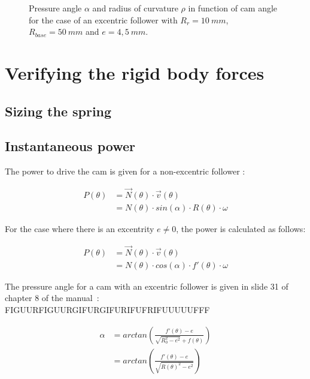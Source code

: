 \documentclass[a4paper]{article}
\begin{document}
\begin{figure}
	\caption{Pressure angle \(\alpha\) and radius of curvature \(\rho\) in function of cam angle for the case of an excentric follower with \(R_r=10~mm\), \(R_{base}=50~mm\) and \(e=4,5~mm\).}
	\label{fig:geomet}
	
\end{figure}

\section{Verifying the rigid body forces}

\subsection{Sizing the spring}

\subsection{Instantaneous power}

The power to drive the cam is given for a non-excentric follower \cite{vermogen}:

\begin{equation}
	\begin{split}
	P(\theta) & = \vec{N}(\theta)\cdot\vec{v}(\theta) \\
	&=N(\theta)\cdot sin(\alpha)\cdot R(\theta)\cdot \omega
	\end{split}
\end{equation}

For the case where there is an excentrity \(e\neq0\), the power is calculated as follows:

\begin{equation}
	\begin{split}
	P(\theta) & = \vec{N}(\theta)\cdot\vec{v}(\theta) \\
	&=N(\theta)\cdot cos(\alpha)\cdot f'(\theta)\cdot\omega
	\end{split}
	\label{eq:verm_exc1}
\end{equation}

The pressure angle for a cam with an excentric follower is given in slide 31 of chapter 8 of the manual~\cite{cursus}: FIGUURFIGUURGIFURGIFURIFUFRIFUUUUUFFF

\begin{equation}
	\begin{split}
	\alpha& = arctan\left(\frac{f'(\theta)-e}{\sqrt{R_0^2-e^2}+f(\theta)}\right)\\
	&=arctan\left(\frac{f'(\theta)-e}{\sqrt{R(\theta)^2-e^2}}\right)
	\end{split}
	\label{eq:verm_exc2}
\end{equation}
\end{document}
